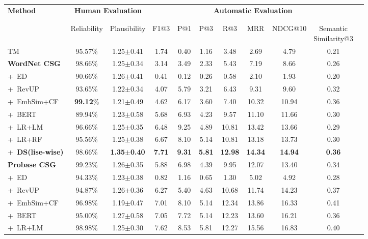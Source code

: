 \begin{table}[t!]
	\footnotesize
	\centering
	\begin{tabular}{lc cc c c c c c cc}
		\toprule
		\multirow{3}{*}{\textbf{Method}} &\multicolumn{2}{c|}{\textbf{Human Evaluation}} &\multicolumn{7}{c}{\textbf{Automatic Evaluation}} \\
		\\ [-1.8ex]
		\cline{2-10}
		\\ [-1.8ex]
		& Reliability & Plausibility  &F1@3 & P@1 & P@3 &R@3 & MRR & NDCG@10 & \tabincell{c}{Semantic \\ Similarity@3}\\
		\midrule
		TM &95.57\%  &1.25$\pm$0.41 &1.74 &0.40  &1.16  &3.48   &2.69  &4.79  &0.21 \\
		\midrule
		\textbf{WordNet CSG} &98.66\% &1.25$\pm$0.34 &3.14 &3.49 &2.33 &5.43 &7.19 &8.66 &0.26 \\
		+~ED &90.66\% &1.26$\pm$0.41  &0.41 &0.12  &0.26  &0.58  &2.10  &1.93  &0.20 \\
		+~RevUP &93.65\%  &1.22$\pm$0.34  &4.07 &5.79  &3.21  &6.43 &9.31  &9.60  &0.32 \\
		+~EmbSim+CF &\textbf{99.12}\%  &1.21$\pm$0.49  &4.62  &6.17  &3.60  &7.40  &10.32  &10.94  &0.36 \\
		+~BERT &89.94\% &1.23$\pm$0.58  &5.68 &6.93  &4.23  &9.57  &11.10  &11.66  &0.30 \\
		+~LR+LM &96.66\%  &1.25$\pm$0.35 &6.48 &9.25  &4.89 &10.81   &13.42 &13.66 &0.29\\
		+~LR+RF &95.56\%  &1.25$\pm$0.38 &6.67 &8.10 &5.14 &10.81   &13.18 &13.73 &0.30 \\
		+~\textbf{DS(lise-wise)} &98.66\%  &\textbf{1.35$\pm$0.40}   &\textbf{7.71} &\textbf{9.31} &\textbf{5.81} &\textbf{12.98} &\textbf{14.34} &\textbf{14.94} &\textbf{0.36} \\
		\midrule
		\textbf{Probase CSG} &99.23\% &1.26$\pm$0.35 &5.88 &6.98 &4.39 &9.95  &12.07 &13.40 &0.34 \\
		+~ED &94.33\%  &1.23$\pm$0.38  &0.82 &1.16  &0.65  &1.30  &5.02  &4.92  &0.28 \\
		+~RevUP &94.87\%  &1.26$\pm$0.36  &6.27 &5.40  &4.63  &10.68  &11.74  &14.23  &0.37 \\
		+~EmbSim+CF &96.98\%  &1.19$\pm$0.47  &7.01 &8.10  &5.14  &12.34  &13.86  &16.33  &0.41 \\
		+~BERT &95.00\% &1.27$\pm$0.58  &7.05 &7.72  &5.14  &12.23  &13.60  &16.21  &0.36 \\
		+~LR+LM &98.98\%  &1.25$\pm$0.30   &7.62  &8.53  &5.81 &12.27 &15.56 &16.83 &0.40 \\

\end{tabular}
\end{table}
